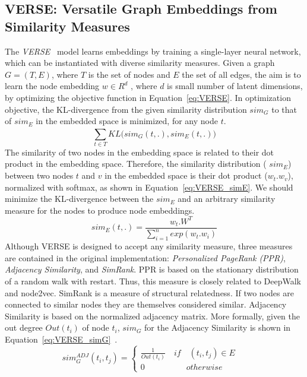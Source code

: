 \subsection{VERSE: Versatile Graph Embeddings from Similarity Measures}
\label{subsec:VERSE}
The \emph{VERSE}~ model learns embeddings by training a single-layer neural network, which can be instantiated with
diverse similarity measures.  Given a graph $G=(T,E)$, where $T$ is the set of nodes and $E$ the set of all edges, the aim is to learn  the node embedding $w \in R^{d}$ , where $d$ is small number of latent dimensions, by optimizing the objective function in Equation~\ref{eq:VERSE}. In optimization objective, the KL-divergence from the given similarity distribution $sim_G$ to that of $sim_E$ in the embedded space is minimized, for any node $t$. 
\begin{equation}
\sum _{ t\in T }^{  }{ KL(sim_{ G }(t,.),sim_{ E } } (t,.))
\label{eq:VERSE}
\end{equation}
The similarity of two nodes in the embedding space is related to their dot product in the embedding space. Therefore, the similarity distribution ( $sim_E$) between two nodes $t$ and $v$ in the embedded space is their dot product ($w_t . w_v$), normalized with softmax, as shown in Equation~\ref{eq:VERSE_simE}. We should minimize the KL-divergence between the $sim_{ E }$ and an arbitrary similarity measure for the nodes to produce node embeddings. 
\begin{equation}
sim_{ E }(t,.)=\frac{ w_{ t }.W^{ T } }{ \sum _{ i=1 }^{ n }{ exp(w_{ t }.w_{ i }) }  }\label{eq:VERSE_simE}
\end{equation}
Although VERSE is designed to accept any similarity measure, three measures are contained in the original implementation: \emph{Personalized PageRank (PPR)},  \emph{Adjacency Similarity}, and  \emph{SimRank}. PPR is based on the stationary distribution of a random walk with restart. Thus, this measure is closely related to DeepWalk and node2vec. SimRank is a measure of structural relatedness. If two nodes are connected to similar nodes they are themselves considered similar. Adjacency Similarity is based on the normalized adjacency matrix. More formally, given the out degree $Out(t_{i})$ of node $t_{i}$, $sim_{ G }$ for the Adjacency Similarity is shown in Equation~\ref{eq:VERSE_simG}~. 
\begin{equation}
sim^{ ADJ }_{ G }(t_{ i },t_{ j })=\left\{ \begin{matrix} \frac { 1 }{ Out(t_{ i }) } \quad if\quad (t_{ i },t_{ j })\in E\quad  \\ 0\quad \qquad \qquad otherwise \end{matrix} \right.\label{eq:VERSE_simG}
\end{equation}
